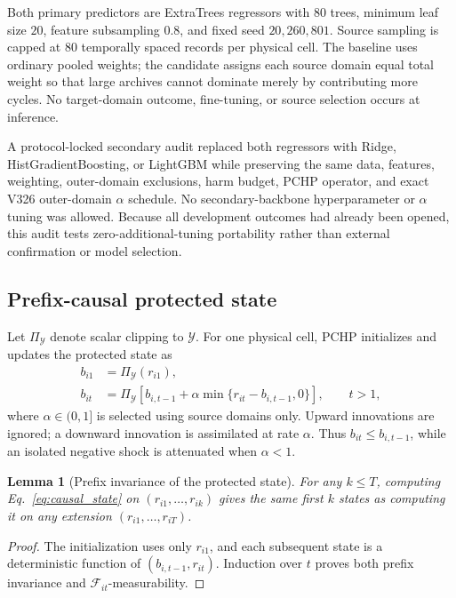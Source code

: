 \documentclass[11pt]{article}
\newtheorem{lemma}{Lemma}
\begin{document}
Both primary predictors are ExtraTrees regressors with $80$ trees, minimum leaf size $20$, feature subsampling $0.8$, and fixed seed $20{,}260{,}801$. Source sampling is capped at $80$ temporally spaced records per physical cell. The baseline uses ordinary pooled weights; the candidate assigns each source domain equal total weight so that large archives cannot dominate merely by contributing more cycles. No target-domain outcome, fine-tuning, or source selection occurs at inference.

A protocol-locked secondary audit replaced both regressors with Ridge, HistGradientBoosting, or LightGBM while preserving the same data, features, weighting, outer-domain exclusions, harm budget, PCHP operator, and exact V326 outer-domain $\alpha$ schedule. No secondary-backbone hyperparameter or $\alpha$ tuning was allowed. Because all development outcomes had already been opened, this audit tests zero-additional-tuning portability rather than external confirmation or model selection.

\subsection{Prefix-causal protected state}

Let $\Pi_{\mathcal Y}$ denote scalar clipping to $\mathcal Y$. For one physical cell, PCHP initializes and updates the protected state as
\begin{align}
  b_{i1}&=\Pi_{\mathcal Y}(r_{i1}),\\
  b_{it}&=\Pi_{\mathcal Y}\!\left[b_{i,t-1}
  +\alpha\min\{r_{it}-b_{i,t-1},0\}\right],\qquad t>1,
  \label{eq:causal_state}
\end{align}
where $\alpha\in(0,1]$ is selected using source domains only. Upward innovations are ignored; a downward innovation is assimilated at rate $\alpha$. Thus $b_{it}\leq b_{i,t-1}$, while an isolated negative shock is attenuated when $\alpha<1$.

\begin{lemma}[Prefix invariance of the protected state]
\label{lem:prefix}
For any $k\leq T$, computing Eq.~\eqref{eq:causal_state} on $(r_{i1},\ldots,r_{ik})$ gives the same first $k$ states as computing it on any extension $(r_{i1},\ldots,r_{iT})$.
\end{lemma}
\begin{proof}
The initialization uses only $r_{i1}$, and each subsequent state is a deterministic function of $(b_{i,t-1},r_{it})$. Induction over $t$ proves both prefix invariance and $\mathcal F_{it}$-measurability.
\end{proof}
\end{document}
